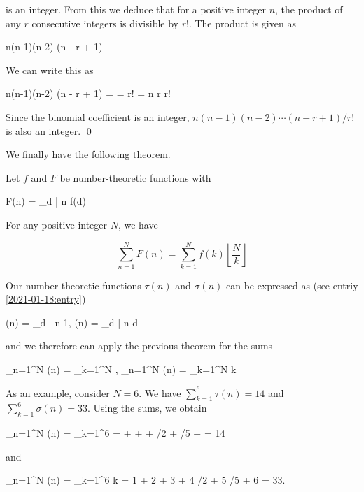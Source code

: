 is an integer. From this we deduce that for a positive integer $n$, the product of any $r$ consecutive integers is divisible by $r!$. The product is given as

\bee
n(n-1)(n-2) \cdots (n - r + 1)
\eee

We can write this as

\bee
n(n-1)(n-2) \cdots (n - r + 1) =  = r! = {n \choose r} r!
\eee

Since the binomial coefficient is an integer, $n(n-1)(n-2) \cdots (n - r + 1) / r!$ is also an integer. \qed

We finally have the following theorem.

\begin{theorem}
    Let $f$ and $F$ be number-theoretic functions with

    \bee
        F(n) = \sum_{d | n} f(d)
    \eee

    For any positive integer $N$, we have

    \begin{equation}
        \sum_{n=1}^N F(n) = \sum_{k=1}^N f(k) \left\lfloor \frac{N}{k} \right\rfloor
    \end{equation}

\end{theorem}

Our number theoretic functions $\tau(n)$ and $\sigma(n)$ can be expressed as (see entriy \ref{2021-01-18:entry})

\bee
\tau(n) = \sum_{d | n} 1, \qquad \sigma(n) = \sum_{d | n} d
\eee

and we therefore can apply the previous theorem for the sums

\bee
\sum_{n=1}^N \tau(n) = \sum_{k=1}^N \left\lfloor {} \right\rfloor, \qquad \sum_{n=1}^N \sigma(n) = \sum_{k=1}^N k \left\lfloor {} \right\rfloor
\eee

As an example, consider $N = 6$. We have $\sum_{k=1}^6 \tau(n) = 14$ and $\sum_{k=1}^6 \sigma(n) = 33$. Using the sums, we obtain

\bee
\sum_{n=1}^N \tau(n) = \sum_{k=1}^6 \left\lfloor {} \right\rfloor =  \rfloor +  \rfloor +  \rfloor + /2 \rfloor + /5 \rfloor +  \rfloor = 14
\eee

and

\bee
\sum_{n=1}^N \sigma(n) = \sum_{k=1}^6 k \left\lfloor {} \right\rfloor = 1  \rfloor + 2  \rfloor + 3  \rfloor + 4 /2 \rfloor + 5 /5 \rfloor + 6  \rfloor = 33.
\eee



